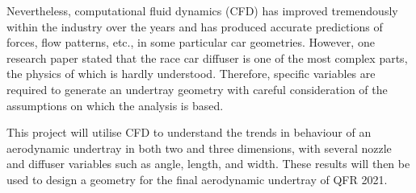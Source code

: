 \noindent Nevertheless, computational fluid dynamics (CFD) has improved tremendously within the industry over the years and has produced accurate predictions of forces, flow patterns, etc., in some particular car geometries. However, one research paper \cite{Zhang2006GroundCars} stated that the race car diffuser is one of the most complex parts, the physics of which is hardly understood. Therefore, specific variables are required to generate an undertray geometry with careful consideration of the assumptions on which the analysis is based.

\noindent This project will utilise CFD to understand the trends in behaviour of an aerodynamic undertray in both two and three dimensions, with several nozzle and diffuser variables such as angle, length, and width. These results will then be used to design a geometry for the final aerodynamic undertray of QFR 2021.

